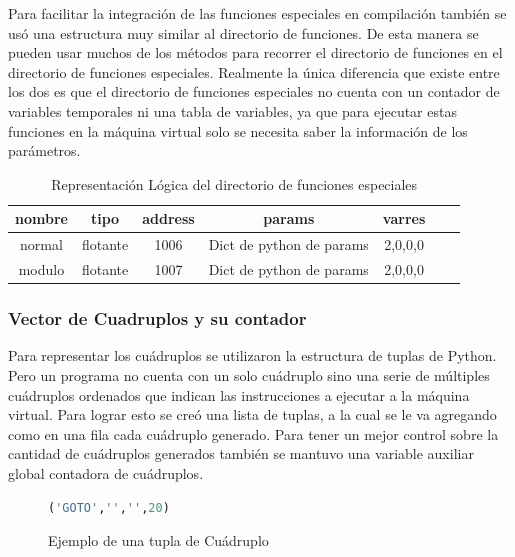 Para facilitar la integración de las funciones especiales en compilación también se usó una estructura muy similar al directorio de funciones. De esta manera se pueden usar muchos de los métodos para recorrer el directorio de funciones en el directorio de funciones especiales. Realmente la única diferencia que existe entre los dos es que el directorio de funciones especiales no cuenta con un contador de variables temporales ni una tabla de variables, ya que para ejecutar estas funciones en la máquina virtual solo se necesita saber la información de los parámetros.


\begin{table}[htbp]
    \centering
    \begin{tabular}{|c|c|c|c|c|c|c|}
        nombre & tipo & address & params & varres \\ \hline
        
         normal & flotante & 1006 & \tiny Dict de python de params  & 2,0,0,0  \\
         modulo & flotante & 1007  & \tiny Dict de python de params & 2,0,0,0  \\
    \end{tabular}
    \caption{Representación Lógica del directorio de funciones especiales}
    \label{tab:my_label}
\end{table}
\FloatBarrier

\FloatBarrier
\subsubsection{Vector de Cuadruplos y su contador}

Para representar los cuádruplos se utilizaron la estructura de tuplas de Python. Pero un programa no cuenta con un solo cuádruplo sino una serie de múltiples cuádruplos ordenados que indican las instrucciones a ejecutar a la máquina virtual. Para lograr esto se creó una lista de tuplas, a la cual se le va agregando como en una fila cada cuádruplo generado. Para tener un mejor control sobre la cantidad de cuádruplos generados también se mantuvo una variable auxiliar global contadora de cuádruplos.

\begin{figure}[htbp]
    \centering
    \begin{lstlisting}[language=Python]
        ('GOTO','','',20)
    \end{lstlisting}
    \caption{Ejemplo de una tupla de Cuádruplo}
    \label{fig:my_label}
\end{figure}

